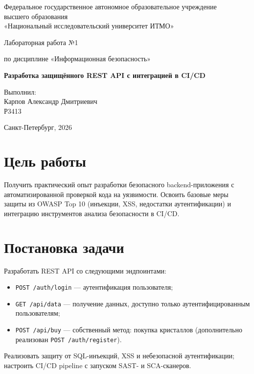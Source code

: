 \documentclass[14pt,a4paper]{extarticle}
\newcommand{\group}{Р3413}
\newcommand{\worknum}{1}
\newcommand{\workname}{Разработка защищённого REST API с интеграцией в CI/CD}
\begin{document}
\begin{titlepage}
    \begin{center}
        Федеральное государственное автономное образовательное учреждение\\
        высшего образования\\
        «Национальный исследовательский университет ИТМО»

        \vfill

        Лабораторная работа №\worknum

        \vspace{0.5cm}
        по дисциплине «Информационная безопасность»

        \vspace{0.5cm}
        \textbf{\workname}
    \end{center}

    \vfill

    \begin{flushright}
        Выполнил:\\
        Карпов Александр Дмитриевич\\
        \group
    \end{flushright}

    \vfill
    \begin{center}
        Санкт-Петербург, 2026
    \end{center}
\end{titlepage}

\tableofcontents
\newpage

\section{Цель работы}
Получить практический опыт разработки безопасного backend-приложения с
автоматизированной проверкой кода на уязвимости. Освоить базовые меры защиты из
OWASP Top 10 (инъекции, XSS, недостатки аутентификации) и интеграцию
инструментов анализа безопасности в CI/CD.

\section{Постановка задачи}
Разработать REST API со следующими эндпоинтами:
\begin{itemize}
    \item \texttt{POST /auth/login} — аутентификация пользователя;
    \item \texttt{GET /api/data} — получение данных, доступно только
          аутентифицированным пользователям;
    \item \texttt{POST /api/buy} — собственный метод: покупка кристаллов
          (дополнительно реализован \texttt{POST /auth/register}).
\end{itemize}
Реализовать защиту от SQL-инъекций, XSS и небезопасной аутентификации; настроить
CI/CD pipeline с запуском SAST- и SCA-сканеров.
\end{document}
